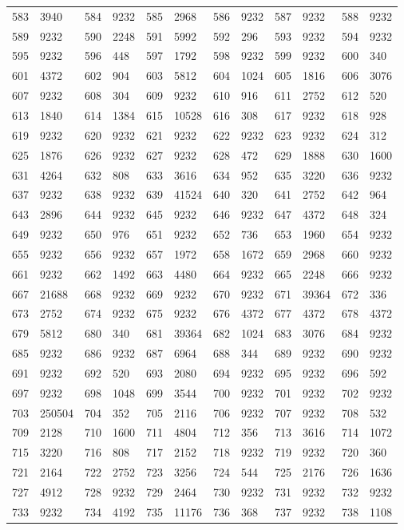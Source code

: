 \begin{longtable}{llllllllllll}
583 & 3940&584 &9232&585& 2968&586 &9232&587 &9232&588& 9232\\
589 & 9232&590 &2248&591& 5992&592 &296&593 &9232&594& 9232\\
595 & 9232&596 &448&597& 1792&598 &9232&599 &9232&600& 340\\
601 & 4372&602 &904&603& 5812&604 &1024&605 &1816&606& 3076\\
607 & 9232&608 &304&609& 9232&610 &916&611 &2752&612& 520\\
613 & 1840&614 &1384&615& 10528&616 &308&617 &9232&618& 928\\
619 & 9232&620 &9232&621& 9232&622 &9232&623 &9232&624& 312\\
625 & 1876&626 &9232&627& 9232&628 &472&629 &1888&630& 1600\\
631 & 4264&632 &808&633& 3616&634 &952&635 &3220&636& 9232\\
637 & 9232&638 &9232&639& 41524&640 &320&641 &2752&642& 964\\
643 & 2896&644 &9232&645& 9232&646 &9232&647 &4372&648& 324\\
649 & 9232&650 &976&651& 9232&652 &736&653 &1960&654& 9232\\
655 & 9232&656 &9232&657& 1972&658 &1672&659 &2968&660& 9232\\
661 & 9232&662 &1492&663& 4480&664 &9232&665 &2248&666& 9232\\
667 & 21688&668 &9232&669& 9232&670 &9232&671 &39364&672& 336\\
673 & 2752&674 &9232&675& 9232&676 &4372&677 &4372&678& 4372\\
679 & 5812&680 &340&681& 39364&682 &1024&683 &3076&684& 9232\\
685 & 9232&686 &9232&687& 6964&688 &344&689 &9232&690& 9232\\
691 & 9232&692 &520&693& 2080&694 &9232&695 &9232&696& 592\\
697 & 9232&698 &1048&699& 3544&700 &9232&701 &9232&702& 9232\\
703 & 250504&704 &352&705& 2116&706 &9232&707 &9232&708& 532\\
709 & 2128&710 &1600&711& 4804&712 &356&713 &3616&714& 1072\\
715 & 3220&716 &808&717& 2152&718 &9232&719 &9232&720& 360\\
721 & 2164&722 &2752&723& 3256&724 &544&725 &2176&726& 1636\\
727 & 4912&728 &9232&729& 2464&730 &9232&731 &9232&732& 9232\\
733 & 9232&734 &4192&735& 11176&736 &368&737 &9232&738& 1108\\

\end{longtable}
